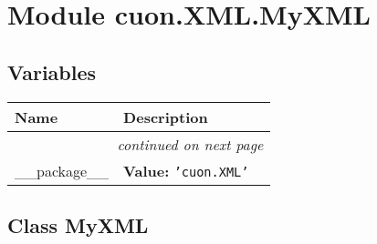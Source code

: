 %
%
%


\section{Module cuon.XML.MyXML}

    \label{cuon:XML:MyXML}


  \subsection{Variables}

    \vspace{-1cm}
\hspace{\varindent}\begin{longtable}{|p{\varnamewidth}|p{\vardescrwidth}|l}
\cline{1-2}
\cline{1-2} \centering \textbf{Name} & \centering \textbf{Description}& \\
\cline{1-2}
\endhead\cline{1-2}\multicolumn{3}{r}{\small\textit{continued on next page}}\\\endfoot\cline{1-2}
\endlastfoot\raggedright \_\-\_\-p\-a\-c\-k\-a\-g\-e\-\_\-\_\- & \raggedright \textbf{Value:} 
{\tt \texttt{'}\texttt{cuon.XML}\texttt{'}}&\\
\cline{1-2}
\end{longtable}



\subsection{Class MyXML}

